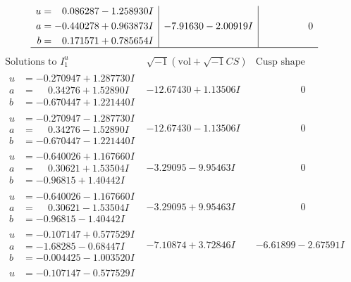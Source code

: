 \documentclass[1p]{elsarticle_modified}
\theoremstyle{definition}
\newcommand{\I}{\sqrt{-1}}
\begin{document}
$$\begin{array}{c|c|c}
\begin{aligned}
u &= \phantom{-}0.086287 - 1.258930 I \\
a &= -0.440278 + 0.963873 I \\
b &= \phantom{-}0.171571 + 0.785654 I\end{aligned}
 & -7.91630 - 2.00919 I & \phantom{-0.000000 } 0\\
 \hline 
 \end{array}$$\newpage$$\begin{array}{c|c|c}  
\text{Solutions to }I^u_{1}& \I (\text{vol} + \sqrt{-1}CS) & \text{Cusp shape}\\
 \hline 
\begin{aligned}
u &= -0.270947 + 1.287730 I \\
a &= \phantom{-}0.34276 + 1.52890 I \\
b &= -0.670447 + 1.221440 I\end{aligned}
 & -12.67430 + 1.13506 I & \phantom{-0.000000 } 0 \\ \hline\begin{aligned}
u &= -0.270947 - 1.287730 I \\
a &= \phantom{-}0.34276 - 1.52890 I \\
b &= -0.670447 - 1.221440 I\end{aligned}
 & -12.67430 - 1.13506 I & \phantom{-0.000000 } 0 \\ \hline\begin{aligned}
u &= -0.640026 + 1.167660 I \\
a &= \phantom{-}0.30621 + 1.53504 I \\
b &= -0.96815 + 1.40442 I\end{aligned}
 & -3.29095 - 9.95463 I & \phantom{-0.000000 } 0 \\ \hline\begin{aligned}
u &= -0.640026 - 1.167660 I \\
a &= \phantom{-}0.30621 - 1.53504 I \\
b &= -0.96815 - 1.40442 I\end{aligned}
 & -3.29095 + 9.95463 I & \phantom{-0.000000 } 0 \\ \hline\begin{aligned}
u &= -0.107147 + 0.577529 I \\
a &= -1.68285 - 0.68447 I \\
b &= -0.004425 - 1.003520 I\end{aligned}
 & -7.10874 + 3.72846 I & -6.61899 - 2.67591 I \\ \hline\begin{aligned}
u &= -0.107147 - 0.577529 I \\

\end{aligned}
\end{array}$$
\end{document}
